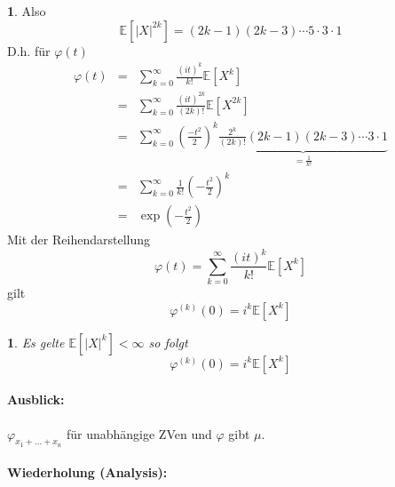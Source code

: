\documentclass[10pt,a4paper]{report}
\numberwithin{equation}{section}
\numberwithin{figure}{section}
\theoremstyle{plain}
\theoremstyle{definition}
\theoremstyle{plain}
\theoremstyle{definition}
\newtheorem{example}{\protect\examplename}[section]
\theoremstyle{remark}
\theoremstyle{plain}
\newtheorem{lem}{\protect\lemmaname}[section]
\theoremstyle{plain}
\theoremstyle{plain}
\theoremstyle{plain}
\theoremstyle{plain}
\providecommand{\examplename}{Beispiel}
\providecommand{\lemmaname}{Lemma}
\newcommand{\1}{ \mathbb{1} } %
\begin{document}
\begin{example}
Also 
\[
\mathbb{E}\left[\left|X\right|^{2k}\right]=\left(2k-1\right)\left(2k-3\right)\cdots5\cdot3\cdot1
\]
D.h. für $\varphi\left(t\right)$
\begin{eqnarray*}
\varphi\left(t\right) & = & \sum_{k=0}^{\infty}\frac{\left(it\right)^{k}}{k!}\mathbb{E}\left[X^{k}\right]\\
 & = & \sum_{k=0}^{\infty}\frac{\left(it\right)^{2k}}{\left(2k\right)!}\mathbb{E}\left[X^{2k}\right]\\
 & = & \sum_{k=0}^{\infty}\left(\frac{-t^{2}}{2}\right)^{k}\underset{=\frac{1}{k!}}{\underbrace{\frac{2^{k}}{(2k)!}\left(2k-1\right)\left(2k-3\right)\cdots3\cdot1}}\\
 & = & \sum_{k=0}^{\infty}\frac{1}{k!}\left(-\frac{t^{2}}{2}\right)^{k}\\
 & = & \exp\left(-\frac{t^{2}}{2}\right)
\end{eqnarray*}
Mit der Reihendarstellung 
\[
\varphi\left(t\right)=\sum_{k=0}^{\infty}\frac{\left(it\right)^{k}}{k!}\mathbb{E}\left[X^{k}\right]
\]
gilt
\[
\varphi^{(k)}\left(0\right)=i^{k}\mathbb{E}\left[X^{k}\right]
\]
 \end{example}
\begin{lem}
Es gelte $\mathbb{E}\left[\left|X\right|^{k}\right]<\infty$ so folgt
\[
\varphi^{\left(k\right)}\left(0\right)=i^{k}\mathbb{E}\left[X^{k}\right]
\]

\end{lem}

\paragraph*{Ausblick:}

$\varphi_{x_{1}+\ldots+x_{n}}$ für unabhängige ZVen und $\varphi$
gibt $\mu$.



\paragraph*{Wiederholung (Analysis): }
\end{document}
